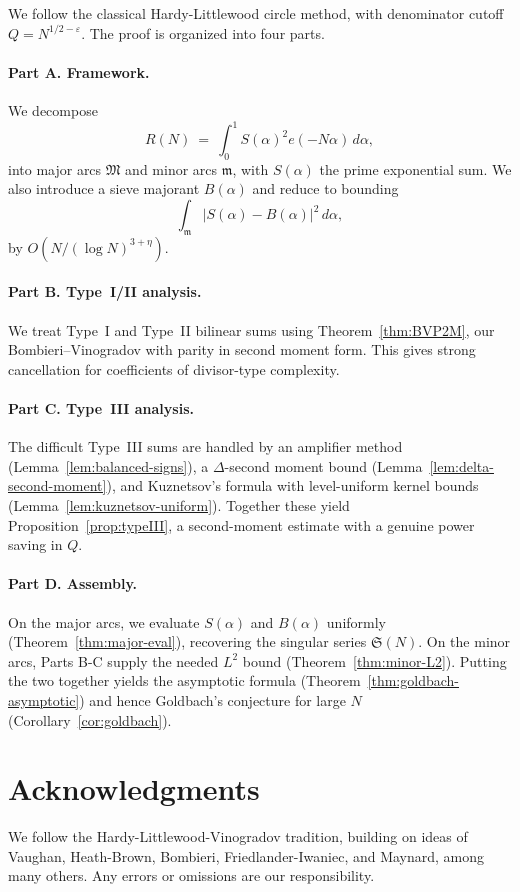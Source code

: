 \documentclass[11pt]{article}
\theoremstyle{definition}
\theoremstyle{remark}
\numberwithin{equation}{part}
\begin{document}
We follow the classical Hardy-Littlewood circle method, with denominator cutoff $Q=N^{1/2-\varepsilon}$.
The proof is organized into four parts.

\paragraph{Part A. Framework.}
We decompose
\[
	R(N)\ =\ \int_0^1 S(\alpha)^2 e(-N\alpha)\,d\alpha,
\]
into major arcs $\mathfrak M$ and minor arcs $\mathfrak m$, with $S(\alpha)$ the prime exponential sum.
We also introduce a sieve majorant $B(\alpha)$ and reduce to bounding
\[
	\int_{\mathfrak m} |S(\alpha)-B(\alpha)|^2\,d\alpha,
\]
by $O(N/(\log N)^{3+\eta})$.

\paragraph{Part B. Type~I/II analysis.}
We treat Type~I and Type~II bilinear sums using Theorem~\ref{thm:BVP2M}, our Bombieri--Vinogradov with parity in second moment form.
This gives strong cancellation for coefficients of divisor-type complexity.

\paragraph{Part C. Type~III analysis.}
The difficult Type~III sums are handled by an amplifier method (Lemma~\ref{lem:balanced-signs}), a $\Delta$-second moment bound (Lemma~\ref{lem:delta-second-moment}), and Kuznetsov's formula with level-uniform kernel bounds (Lemma~\ref{lem:kuznetsov-uniform}).
Together these yield Proposition~\ref{prop:typeIII}, a second-moment estimate with a genuine power saving in $Q$.

\paragraph{Part D. Assembly.}
On the major arcs, we evaluate $S(\alpha)$ and $B(\alpha)$ uniformly (Theorem~\ref{thm:major-eval}), recovering the singular series $\mathfrak S(N)$.
On the minor arcs, Parts B-C supply the needed $L^2$ bound (Theorem~\ref{thm:minor-L2}).
Putting the two together yields the asymptotic formula (Theorem~\ref{thm:goldbach-asymptotic}) and hence Goldbach's conjecture for large $N$ (Corollary~\ref{cor:goldbach}).

\section*{Acknowledgments}
We follow the Hardy-Littlewood-Vinogradov tradition, building on ideas of Vaughan, Heath-Brown, Bombieri, Friedlander-Iwaniec, and Maynard, among many others.
Any errors or omissions are our responsibility.
\end{document}
